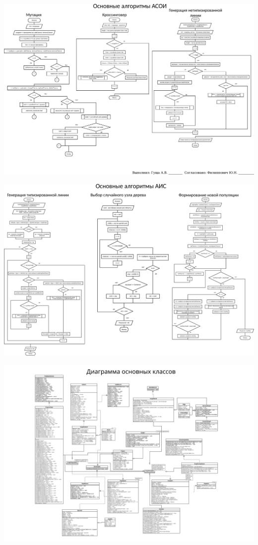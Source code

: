 \documentclass[russian,utf8, a1paper]{eskdgraph}
\begin{document}
\begin{ESKDdrawing}
\includegraphics[scale=1.0]{list4}
\end{ESKDdrawing}

\begin{ESKDdrawing}
\includegraphics[scale=1.0]{list5}
\end{ESKDdrawing}

\begin{ESKDdrawing}
\includegraphics[scale=0.99]{list6}
\end{ESKDdrawing}
\end{document}
